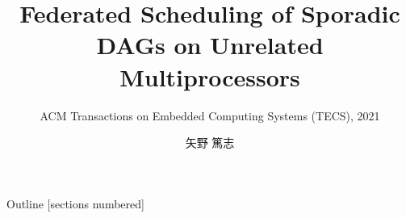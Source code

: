\newcommand{\beamerDir}[0]{/mnt/c/Users/atsushi/Documents/workspace/env/Beamer/beamer/beamer/}





\newcommand{\forme}[1]{}


\title{Federated Scheduling of Sporadic DAGs on Unrelated Multiprocessors}
\subtitle{ACM Transactions on Embedded Computing Systems (TECS), 2021}
\author{矢野 篤志}




\maketitle



\begin{frame}{Outline}
    [sections numbered]
    \tiny\tableofcontents[hideallsubsections]
\end{frame}











\lastpage

%     
%     


